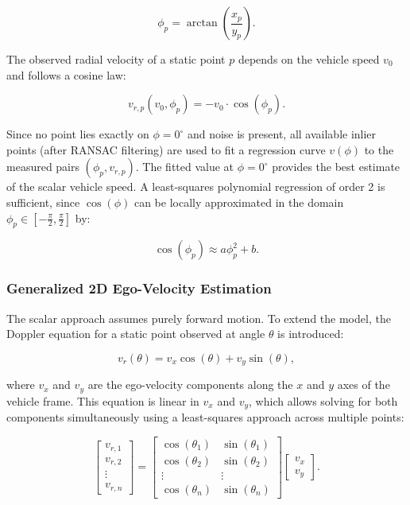 \[
\phi_{p} = \arctan\left(\frac{x_p}{y_p}\right).
\]

The observed radial velocity of a static point $p$ depends on the vehicle speed $v_0$ and follows a cosine law:  

\[
v_{r,p}(v_0,\phi_p) = -v_0 \cdot \cos(\phi_p).
\]

Since no point lies exactly on $\phi=0^\circ$ and noise is present, all available inlier points (after RANSAC filtering) are used to fit a regression curve $v(\phi)$ to the measured pairs $(\phi_p, v_{r,p})$. 
The fitted value at $\phi = 0^\circ$ provides the best estimate of the scalar vehicle speed. 
A least-squares polynomial regression of order 2 is sufficient, since $\cos(\phi)$ can be locally approximated in the domain $\phi_p \in \left[-\frac{\pi}{2}, \frac{\pi}{2}\right]$ by:  

\[
\cos(\phi_p) \approx a \phi_p^2 + b.
\]

\subsubsection*{Generalized 2D Ego-Velocity Estimation}
The scalar approach assumes purely forward motion. 
To extend the model, the Doppler equation for a static point observed at angle $\theta$ is introduced:  

\[
v_{r}(\theta) = v_x \cos(\theta) + v_y \sin(\theta),
\]

where $v_x$ and $v_y$ are the ego-velocity components along the $x$ and $y$ axes of the vehicle frame.  
This equation is linear in $v_x$ and $v_y$, which allows solving for both components simultaneously using a least-squares approach across multiple points:  

\[
\begin{bmatrix}
v_{r,1} \\
v_{r,2} \\
\vdots \\
v_{r,n}
\end{bmatrix}
=
\begin{bmatrix}
\cos(\theta_1) & \sin(\theta_1) \\
\cos(\theta_2) & \sin(\theta_2) \\
\vdots & \vdots \\
\cos(\theta_n) & \sin(\theta_n)
\end{bmatrix}
\begin{bmatrix}
v_x \\ v_y
\end{bmatrix}.
\]

